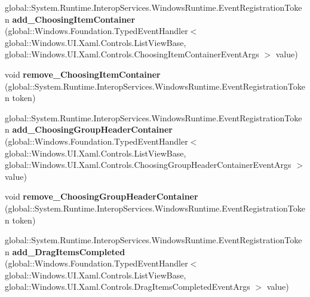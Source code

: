 \begin{DoxyCompactItemize}
global\+::\+System.\+Runtime.\+Interop\+Services.\+Windows\+Runtime.\+Event\+Registration\+Token {\bfseries add\+\_\+\+Choosing\+Item\+Container} (global\+::\+Windows.\+Foundation.\+Typed\+Event\+Handler$<$ global\+::\+Windows.\+U\+I.\+Xaml.\+Controls.\+List\+View\+Base, global\+::\+Windows.\+U\+I.\+Xaml.\+Controls.\+Choosing\+Item\+Container\+Event\+Args $>$ value)
\item 
\mbox{\label{interface_windows_1_1_u_i_1_1_xaml_1_1_controls_1_1_i_list_view_base4_ae03f9cc1626fb8ce344e627e8be05680}} 
void {\bfseries remove\+\_\+\+Choosing\+Item\+Container} (global\+::\+System.\+Runtime.\+Interop\+Services.\+Windows\+Runtime.\+Event\+Registration\+Token token)
\item 
\mbox{\label{interface_windows_1_1_u_i_1_1_xaml_1_1_controls_1_1_i_list_view_base4_a676b16cd7663b4ae45652525cdbe9e66}} 
global\+::\+System.\+Runtime.\+Interop\+Services.\+Windows\+Runtime.\+Event\+Registration\+Token {\bfseries add\+\_\+\+Choosing\+Group\+Header\+Container} (global\+::\+Windows.\+Foundation.\+Typed\+Event\+Handler$<$ global\+::\+Windows.\+U\+I.\+Xaml.\+Controls.\+List\+View\+Base, global\+::\+Windows.\+U\+I.\+Xaml.\+Controls.\+Choosing\+Group\+Header\+Container\+Event\+Args $>$ value)
\item 
\mbox{\label{interface_windows_1_1_u_i_1_1_xaml_1_1_controls_1_1_i_list_view_base4_acbca9310b039930aacfa0158b9dd0a63}} 
void {\bfseries remove\+\_\+\+Choosing\+Group\+Header\+Container} (global\+::\+System.\+Runtime.\+Interop\+Services.\+Windows\+Runtime.\+Event\+Registration\+Token token)
\item 
\mbox{\label{interface_windows_1_1_u_i_1_1_xaml_1_1_controls_1_1_i_list_view_base4_a8ded6e3ecc87209cec3cfd04f4282042}} 
global\+::\+System.\+Runtime.\+Interop\+Services.\+Windows\+Runtime.\+Event\+Registration\+Token {\bfseries add\+\_\+\+Drag\+Items\+Completed} (global\+::\+Windows.\+Foundation.\+Typed\+Event\+Handler$<$ global\+::\+Windows.\+U\+I.\+Xaml.\+Controls.\+List\+View\+Base, global\+::\+Windows.\+U\+I.\+Xaml.\+Controls.\+Drag\+Items\+Completed\+Event\+Args $>$ value)
\item 

\end{DoxyCompactItemize}
